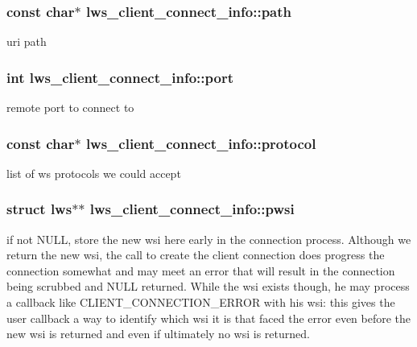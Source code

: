 \subsubsection[{\texorpdfstring{path}{path}}]{\setlength{\rightskip}{0pt plus 5cm}const char$\ast$ lws\+\_\+client\+\_\+connect\+\_\+info\+::path}\hypertarget{structlws__client__connect__info_a76a8388733f114fb8fd3643874781185}{}\label{structlws__client__connect__info_a76a8388733f114fb8fd3643874781185}
uri path 
\subsubsection[{\texorpdfstring{port}{port}}]{\setlength{\rightskip}{0pt plus 5cm}int lws\+\_\+client\+\_\+connect\+\_\+info\+::port}\hypertarget{structlws__client__connect__info_a1af124d81c3c22a46d39387c5bc3d6b9}{}\label{structlws__client__connect__info_a1af124d81c3c22a46d39387c5bc3d6b9}
remote port to connect to 
\subsubsection[{\texorpdfstring{protocol}{protocol}}]{\setlength{\rightskip}{0pt plus 5cm}const char$\ast$ lws\+\_\+client\+\_\+connect\+\_\+info\+::protocol}\hypertarget{structlws__client__connect__info_aba35adfb74845a5fd0c3dc141cbdddd2}{}\label{structlws__client__connect__info_aba35adfb74845a5fd0c3dc141cbdddd2}
list of ws protocols we could accept 
\subsubsection[{\texorpdfstring{pwsi}{pwsi}}]{\setlength{\rightskip}{0pt plus 5cm}struct lws$\ast$$\ast$ lws\+\_\+client\+\_\+connect\+\_\+info\+::pwsi}\hypertarget{structlws__client__connect__info_a065063b5117ecd0a59567c97f04bda2e}{}\label{structlws__client__connect__info_a065063b5117ecd0a59567c97f04bda2e}
if not N\+U\+LL, store the new wsi here early in the connection process. Although we return the new wsi, the call to create the client connection does progress the connection somewhat and may meet an error that will result in the connection being scrubbed and N\+U\+LL returned. While the wsi exists though, he may process a callback like C\+L\+I\+E\+N\+T\+\_\+\+C\+O\+N\+N\+E\+C\+T\+I\+O\+N\+\_\+\+E\+R\+R\+OR with his wsi\+: this gives the user callback a way to identify which wsi it is that faced the error even before the new wsi is returned and even if ultimately no wsi is returned. 
